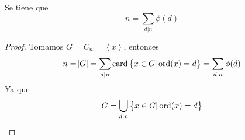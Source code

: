 \begin{col}
    Se tiene que
    \[
        n = \sum_{d \vert n} \phi(d)
    \]
\end{col}

\begin{proof}
    Tomamos $G = C_n = \left< x \right>$, entonces
    \[
        n = \abs{G} = \sum_{d \vert n} \operatorname{card} \left\{ x \in G \vert \operatorname{ord}(x) =d \right\} = \sum_{d \vert n} \phi(d)
    \]
    Ya que
    \[
        G = \bigcup_{d \vert n} \left\{x \in G \vert \operatorname{ord}(x) = d \right\}
    \]
\end{proof}
